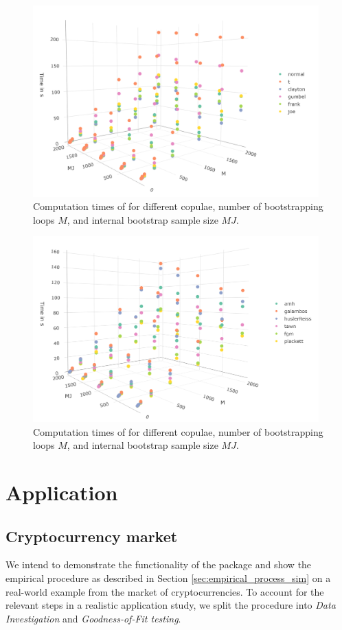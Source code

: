\begin{figure}[H]
	\centering
 \includegraphics[width=11cm]{img/Time_Kernel_1.PNG}
	\caption{Computation times of \protect{} for different copulae, number of bootstrapping loops $M$, and internal bootstrap sample size $MJ$.}
	\label{fig:Time_Kernel_1}
\end{figure}

\begin{figure}[H]
	\centering
 \includegraphics[width=11cm]{img/Time_Kernel_2.PNG}
	\caption{Computation times of \protect{} for different copulae, number of bootstrapping loops $M$, and internal bootstrap sample size $MJ$.}
	\label{fig:Time_Kernel_2}
\end{figure}

\section{Application}
\label{sec:application}
\subsection{Cryptocurrency market}
\label{subsec:Cryptos}
We intend to demonstrate the functionality of the  package and show the empirical procedure as described in Section \ref{sec:empirical_process_sim} on a real-world example from the market of cryptocurrencies. To account for the relevant steps in a realistic application study, we split the procedure into \emph{Data Investigation} and \emph{Goodness-of-Fit testing}.


